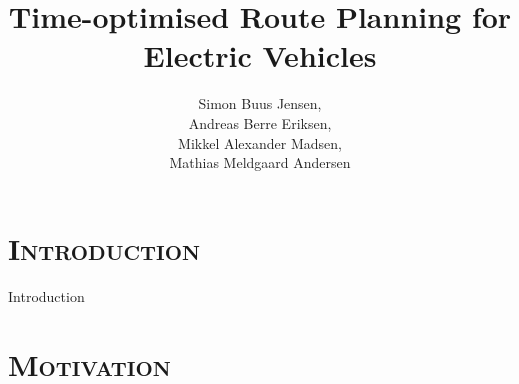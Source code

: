 \section{\scshape Introduction}
\begin{frame}
\title{\huge Time-optimised Route Planning for Electric Vehicles}
\author{
 Simon Buus Jensen,\\
 Andreas Berre Eriksen,\\
 Mikkel Alexander Madsen,\\
 Mathias Meldgaard Andersen\\
}

\titlepage
\end{frame}

\begin{frame}{Introduction}
\tableofcontents
\end{frame}

\section{\scshape Motivation}
